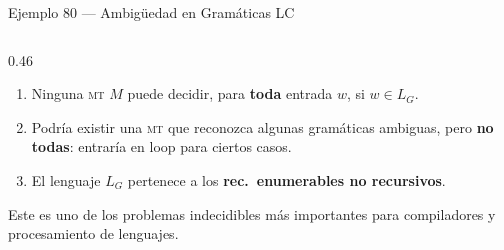 \documentclass[aspectratio=1610, 12pt]{beamer}
\newcommand{\MT}{\textsc{mt}}
\begin{document}
\begin{frame}[t]{Ejemplo 80 — Ambigüedad en Gramáticas LC}
\begin{columns}[T]
  \begin{column}{0.46\textwidth}
    \begin{defbox}
      \scriptsize %
      \begin{enumerate}\setlength{\itemsep}{2pt} %
        \item[\textcolor{MedBlue}{1.}]
          Ninguna \MT{} $M$ puede decidir,
          para \textbf{toda} entrada $w$, si $w \in L_G$.
        \item[\textcolor{MedBlue}{2.}]
          Podría existir una \MT{} que reconozca
          algunas gramáticas ambiguas,
          pero \textbf{no todas}: entraría en loop
          para ciertos casos.
        \item[\textcolor{MedBlue}{3.}]
          El lenguaje $L_G$ pertenece a los
          \textbf{rec.\ enumerables no recursivos}.
      \end{enumerate}
    \end{defbox}

    \vspace{2pt}
    {\scriptsize\color{SlateGray}
      Este es uno de los problemas indecidibles más importantes
      para compiladores y procesamiento de lenguajes.}
  \end{column}

\end{columns}
\end{frame}
\end{document}
